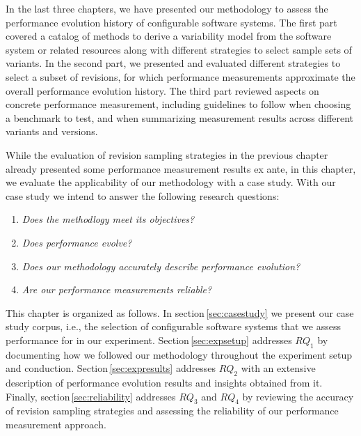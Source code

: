 In the last three chapters, we have presented our methodology to assess the
performance evolution history of configurable software systems. The first part
covered a catalog of methods to derive a variability model from the software
system or related resources along with different strategies to select sample
sets of variants. In the second part, we presented and evaluated different
strategies to select a subset of revisions, for which performance measurements
approximate the overall performance evolution history. The third part reviewed
aspects on concrete performance measurement, including guidelines to follow when choosing
a benchmark to test, and when summarizing measurement results across different
variants and versions.

While the evaluation of revision sampling strategies in the previous chapter
already presented some performance measurement results ex ante, in this chapter, we
evaluate the applicability of our methodology with a case study. With our case
study we intend to answer the following research questions:

\begin{enumerate}[$RQ_1$)]
  \item \emph{Does the methodlogy meet its objectives?}
  \item \emph{Does performance evolve?}
  \item \emph{Does our methodology accurately describe performance evolution?}
  \item \emph{Are our performance measurements reliable?}
\end{enumerate}

This chapter is organized as follows. In section\,\ref{sec:casestudy} we present
our case study corpus, i.e., the selection of configurable software systems that we
assess performance for in our experiment. Section\,\ref{sec:expsetup} addresses
$RQ_1$ by documenting how we followed our methodology throughout the experiment
setup and conduction. Section\,\ref{sec:expresults} addresses $RQ_2$  with an
extensive description of performance evolution results and insights obtained from it.
Finally, section\,\ref{sec:reliability} addresses $RQ_3$ and $RQ_4$ by reviewing
the accuracy of revision sampling strategies and assessing the reliability of our performance measurement approach.

